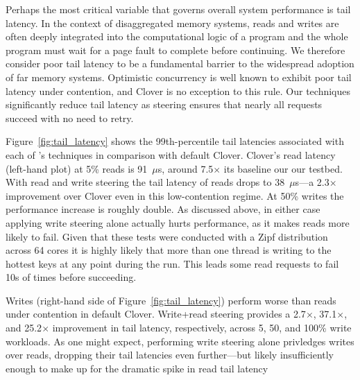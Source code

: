 Perhaps the most critical variable that governs overall system
performance is tail latency. In the context of disaggregated memory
systems, reads and writes are often deeply integrated into the
computational logic of a program and the whole program must wait for a
page fault to complete before continuing. We therefore consider poor
tail latency to be a fundamental barrier to the widespread adoption of
far memory systems.  Optimistic concurrency is well known to exhibit
poor tail latency under contention, and Clover is no exception to this
rule. Our techniques significantly reduce tail latency as steering
ensures that nearly all requests succeed with no need to retry.

Figure~\ref{fig:tail_latency} shows the 99th-percentile tail latencies
associated with each of \sword's techniques in comparison with default
Clover. Clover's read latency (left-hand plot) at 5\% reads is
91~$\mu$s, around 7.5$\times$ its baseline our our testbed. With read
and write steering the tail latency of reads drops to 38~$\mu$s---a
2.3$\times$ improvement over Clover even in this low-contention
regime. At 50\% writes the performance increase is roughly double.  As
discussed above, in either case applying write steering alone actually
hurts performance, as it makes reads more likely to fail.
Given that these tests were conducted with a
Zipf distribution across 64 cores it is highly likely that more than
one thread is writing to the hottest keys at any point during the
run. This leads some read requests to fail 10s of times before
succeeding.


Writes (right-hand side of Figure~\ref{fig:tail_latency}) perform
worse than reads under contention in default Clover. Write+read
steering provides a 2.7$\times$, 37.1$\times$, and 25.2$\times$
improvement in tail latency, respectively, across 5, 50, and 100\%
write workloads.  As one might expect, performing write steering alone
privledges writes over reads, dropping their tail latencies even
further---but likely insufficiently enough to make up for the dramatic
spike in read tail latency

